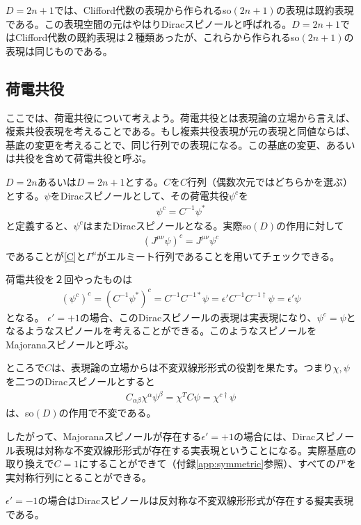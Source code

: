 \documentclass[12pt,a4paper]{jlreq}
\begin{document}
$D=2n+1$では、Clifford代数の表現から作られるso$(2n+1)$の表現は既約表現である。この表現空間の元はやはりDiracスピノールと呼ばれる。$D=2n+1$ではClifford代数の既約表現は２種類あったが、これらから作られるso$(2n+1)$の表現は同じものである。

\subsection{荷電共役}
ここでは、荷電共役について考えよう。荷電共役とは表現論の立場から言えば、複素共役表現を考えることである。もし複素共役表現が元の表現と同値ならば、基底の変更を考えることで、同じ行列での表現になる。この基底の変更、あるいは共役を含めて荷電共役と呼ぶ。

$D=2n$あるいは$D=2n+1$とする。$C$を$C$行列（偶数次元ではどちらかを選ぶ）とする。$\psi$をDiracスピノールとして、その荷電共役$\psi^{c}$を
\begin{align}
  \psi^{c}=C^{-1}\psi^{*}\label{charge-conj}
\end{align}
と定義すると、$\psi^{c}$はまたDiracスピノールとなる。実際so$(D)$の作用に対して
\begin{align*}
  (J^{\mu\nu}\psi)^{c}=J^{\mu\nu}\psi^{c}
\end{align*}
であることが\eqref{C}と$\Gamma^{\mu}$がエルミート行列であることを用いてチェックできる。

荷電共役を２回やったものは
\begin{align*}
  (\psi^{c})^c=(C^{-1}\psi^{*})^c
  =C^{-1} C^{-1 *} \psi
  =\epsilon' C^{-1}C^{-1\dag} \psi
  =\epsilon' \psi
\end{align*}
となる。 $\epsilon'=+1$の場合、このDiracスピノールの表現は実表現になり、$\psi^c=\psi$となるようなスピノールを考えることができる。このようなスピノールをMajoranaスピノールと呼ぶ。

ところで$C$は、表現論の立場からは不変双線形形式の役割を果たす。つまり$\chi,\psi$を二つのDiracスピノールとすると
\begin{align*}
  C_{\alpha\beta}\chi^{\alpha}\psi^{\beta}
  =\chi^{T}C\psi=\chi^{c \dag} \psi
\end{align*}
は、so$(D)$の作用で不変である。

したがって、Majoranaスピノールが存在する$\epsilon'=+1$の場合には、Diracスピノール表現は対称な不変双線形形式が存在する実表現ということになる。実際基底の取り換えで$C=1$にすることができて（付録\ref{app:symmetric}参照）、すべての$\Gamma^{\mu}$を実対称行列にとることができる。

$\epsilon'=-1$の場合はDiracスピノールは反対称な不変双線形形式が存在する擬実表現である。
\end{document}
